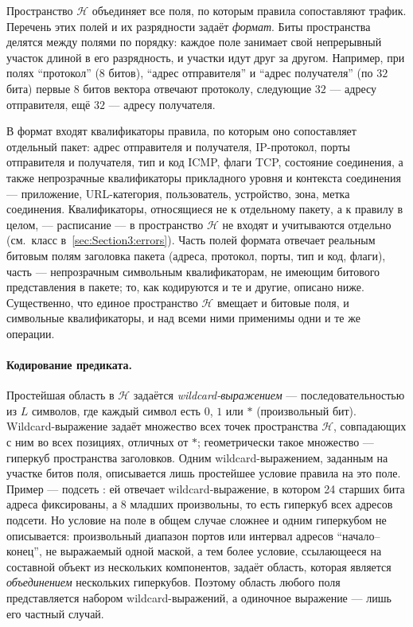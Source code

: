 Пространство $\mathcal{H}$ объединяет все поля, по которым правила сопоставляют трафик. Перечень этих полей и их разрядности задаёт \emph{формат}. Биты пространства делятся между полями по порядку: каждое поле занимает свой непрерывный участок длиной в его разрядность, и участки идут друг за другом. Например, при полях ``протокол'' ($8$ битов), ``адрес отправителя'' и ``адрес получателя'' (по $32$ бита) первые $8$ битов вектора отвечают протоколу, следующие $32$ --- адресу отправителя, ещё $32$ --- адресу получателя.

В формат входят квалификаторы правила, по которым оно сопоставляет отдельный пакет: адрес отправителя и получателя, IP-протокол, порты отправителя и получателя, тип и код ICMP, флаги TCP, состояние соединения, а также непрозрачные квалификаторы прикладного уровня и контекста соединения --- приложение, URL-категория, пользователь, устройство, зона, метка соединения. Квалификаторы, относящиеся не к отдельному пакету, а к правилу в целом, --- расписание --- в пространство $\mathcal{H}$ не входят и учитываются отдельно (см.~класс  в~\ref{sec:Section3:errors}). Часть полей формата отвечает реальным битовым полям заголовка пакета (адреса, протокол, порты, тип и код, флаги), часть --- непрозрачным символьным квалификаторам, не имеющим битового представления в пакете; то, как кодируются и те и другие, описано ниже. Существенно, что единое пространство $\mathcal{H}$ вмещает и битовые поля, и символьные квалификаторы, и над всеми ними применимы одни и те же операции.

\paragraph{Кодирование предиката.} Простейшая область в $\mathcal{H}$ задаётся \emph{wildcard-выражением} --- последовательностью из $L$ символов, где каждый символ есть $0$, $1$ или $\ast$ (произвольный бит). Wildcard-выражение задаёт множество всех точек пространства $\mathcal{H}$, совпадающих с ним во всех позициях, отличных от $\ast$; геометрически такое множество --- гиперкуб пространства заголовков. Одним wildcard-выражением, заданным на участке битов поля, описывается лишь простейшее условие правила на это поле. Пример --- подсеть : ей отвечает wildcard-выражение, в котором 24 старших бита адреса фиксированы, а 8 младших произвольны, то есть гиперкуб всех адресов подсети. Но условие на поле в общем случае сложнее и одним гиперкубом не описывается: произвольный диапазон портов или интервал адресов ``начало--конец'', не выражаемый одной маской, а тем более условие, ссылающееся на составной объект из нескольких компонентов, задаёт область, которая является \emph{объединением} нескольких гиперкубов. Поэтому область любого поля представляется набором wildcard-выражений, а одиночное выражение --- лишь его частный случай.

